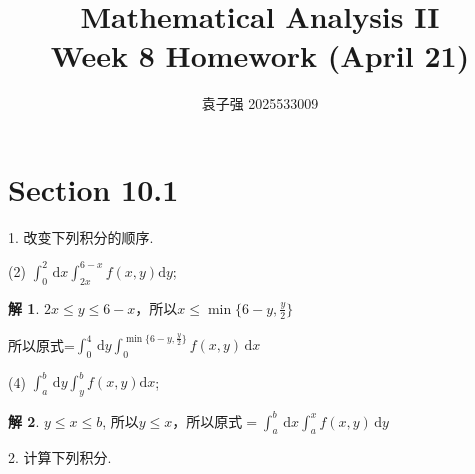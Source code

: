 \documentclass[a4paper,12pt]{article}
\title{Mathematical Analysis II\\Week 8 Homework (April 21)}
\author{袁子强\hspace{1cm} 2025533009}
\theoremstyle{definition}
\newtheorem*{sol}{解}
\begin{document}
\maketitle

\section*{Section 10.1}

1. 改变下列积分的顺序.

(2) $\displaystyle\int_{0}^{2}\,\mathrm{d}x \int_{2x}^{6-x} f(x,y) \mathrm{d}y$;
\begin{sol}
    $2x\leq y\leq 6-x$，所以$x\leq\min\{6-y,\frac{y}{2}\}$

    所以原式=$\int_0^4\,\mathrm{d}y\int_0^{\min\{6-y,\frac{y}{2}\}}f(x,y)\,\mathrm{d}x$
\end{sol}
(4) $\displaystyle\int_{a}^{b}\,\mathrm{d}y \int_{y}^{b} f(x,y) \mathrm{d}x$;
\begin{sol}
    $y\leq x\leq b$, 所以$y\leq x$，所以原式$=\int_a^b\,\mathrm{d}x\int_a^x f(x,y)\,\mathrm{d}y$
\end{sol}


2. 计算下列积分.
\end{document}
